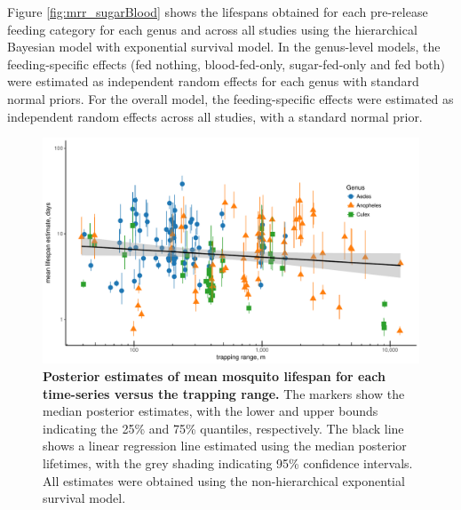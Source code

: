 \documentclass[12pt]{article}
\begin{document}
{Figure \ref{fig:mrr_sugarBlood} shows the lifespans obtained for each pre-release feeding category for each genus and across all studies using the hierarchical Bayesian model with exponential survival model. In the genus-level models, the feeding-specific effects (fed nothing, blood-fed-only, sugar-fed-only and fed both) were estimated as independent random effects for each genus with standard normal priors. For the overall model, the feeding-specific effects were estimated as independent random effects across all studies, with a standard normal prior.

\begin{figure}[h]
	\centerline{\includegraphics[width=1\textwidth]{./Figure_files/mrr_lifeSpanVsRange.pdf}}
	\caption{\textbf{Posterior estimates of mean mosquito lifespan for each time-series versus the trapping range.} The markers show the median posterior estimates, with the lower and upper bounds indicating the 25\% and 75\% quantiles, respectively. The black line shows a linear regression line estimated using the median posterior lifetimes, with the grey shading indicating 95\% confidence intervals. All estimates were obtained using the non-hierarchical exponential survival model.}
	\label{fig:mrr_lifeSpanVsRange}
\end{figure}

}
\end{document}
